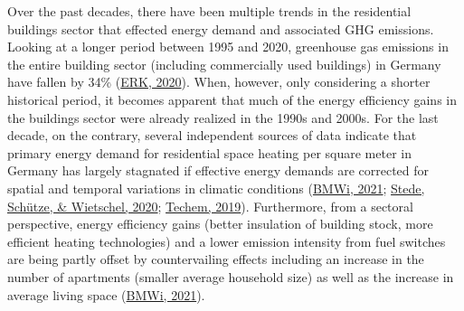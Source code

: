 \documentclass[12pt,twoside]{reedthesis}
\begin{document}
Over the past decades, there have been multiple trends in the residential buildings sector that effected energy demand and associated GHG emissions. Looking at a longer period between 1995 and 2020, greenhouse gas emissions in the entire building sector (including commercially used buildings) in Germany have fallen by 34\% (\protect\hyperlink{ref-erk20}{ERK, 2020}). When, however, only considering a shorter historical period, it becomes apparent that much of the energy efficiency gains in the buildings sector were already realized in the 1990s and 2000s. For the last decade, on the contrary, several independent sources of data indicate that primary energy demand for residential space heating per square meter in Germany has largely stagnated if effective energy demands are corrected for spatial and temporal variations in climatic conditions (\protect\hyperlink{ref-bmwi21}{BMWi, 2021}; \protect\hyperlink{ref-stede_etal20}{Stede, Schütze, \& Wietschel, 2020}; \protect\hyperlink{ref-techem19}{Techem, 2019}). Furthermore, from a sectoral perspective, energy efficiency gains (better insulation of building stock, more efficient heating technologies) and a lower emission intensity from fuel switches are being partly offset by countervailing effects including an increase in the number of apartments (smaller average household size) as well as the increase in average living space (\protect\hyperlink{ref-bmwi21}{BMWi, 2021}).
\end{document}

